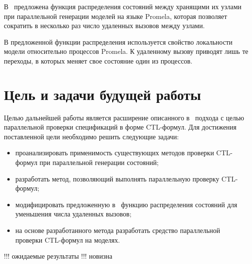 \documentclass[a4paper,notitlepage,14pt]{article}
\begin{document}
В~\cite{Korotkov10Miem} предложена функция распределения состояний между хранящими их
узлами при параллельной генерации моделей на языке Promela, которая позволяет сократить в
несколько раз число удаленных вызовов между узлами.

В предложенной функции распределения используется свойство локальности модели относительно
процессов Promela. К удаленному вызову приводят лишь те переходы, в которых меняет свое
состояние один из процессов.

\section{Цель и задачи будущей работы}
\label{sec:future-goals}

Целью дальнейшей работы является расширение описанного в~\cite{Korotkov10Miem} подхода с
целью параллельной проверки спецификаций в форме CTL-формул. Для достижения поставленной
цели необходимо решить следующие задачи:

\begin{itemize}
\item проанализировать применимость существующих методов проверки CTL-формул при
  параллельной генерации состояний;
\item разработать метод, позволяющий выполнять параллельную проверку CTL-формул;
\item модифицировать предложенную в~\cite{Korotkov10Miem} функцию распределения состояний
  для уменьшения числа удаленных вызовов;
\item на основе разработанного метода разработать средство параллельной проверки
  CTL-формул на моделях.
\end{itemize}

!!! ожидаемые результаты
!!! новизна



\end{document}
